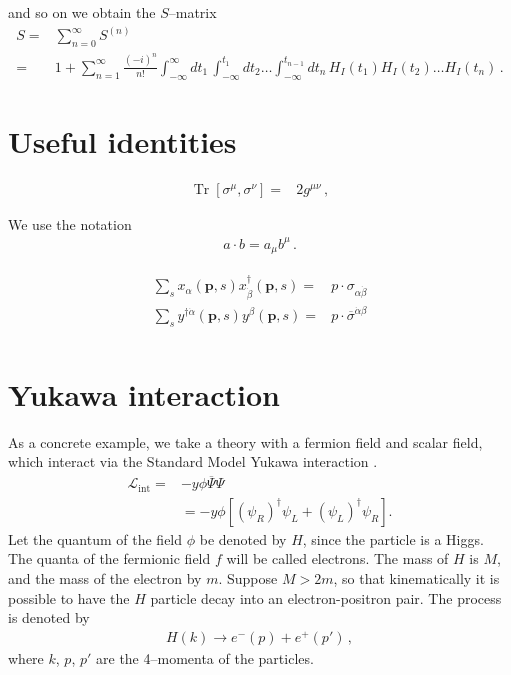 and so on we obtain the $S$--matrix
\begin{align}
  S=&\sum_{n=0}^\infty S^{(n)}\nonumber\\
  =&1+\sum_{n=1}^\infty\frac{(-i)^n}{n!}\int_{-\infty}^{\infty}d t_1\,\int_{-\infty}^{t_1} d t_2\ldots\int_{-\infty}^{t_{n-1}}d t_n\,{H}_I(t_1){H}_I(t_2)\ldots{H}_I(t_n)\,.
\end{align}

\section{Useful identities}
\begin{align} %
  \label{eq:trss}
  \operatorname{Tr}\left[ \sigma^{\mu},\sigma^{\nu} \right]=&2 g^{\mu\nu}\,,
\end{align}


We use the notation
\begin{align}
  a\cdot b=a_{\mu}b^{\mu}\,.
\end{align}

\begin{align}
\label{eq:xxd}
  \sum_s x_{\alpha}(\mathbf{p},s)x^{\dagger}_{\dot{\beta}}(\mathbf{p},s)=&p\cdot \sigma_{\alpha\dot{\beta}} \nonumber\\
   \sum_s y^{\dagger \dot{\alpha}}(\mathbf{p},s) y^{\beta}(\mathbf{p},s)=&p\cdot \overline{\sigma}^{\dot{\alpha}\beta} \nonumber\\
\end{align}



\section{Yukawa interaction}
\label{sec:feynman-diagrams}
As a concrete example, we take a theory with a fermion field and scalar field, which interact via the Standard Model Yukawa interaction \cite{Lahiri:2005sm}. 
\begin{align}
\label{eq:lppp}
  \mathcal{L}_{\text{int}}=&-y\phi\overline{\Psi}\Psi \nonumber\\
&=-y \phi \left[\left( \psi_R \right)^{\dagger}\psi_L+\left(\psi_L \right)^{\dagger}\psi_R  \right].
\end{align}
Let the quantum of the field $\phi$ be denoted by $H$, since the particle is a Higgs. The quanta of the fermionic field $f$ will be called electrons. The mass of $H$ is $M$, and the mass of the electron by $m$. Suppose $M\gt 2m$,  so that kinematically it is possible to have the $H$ particle decay into an electron-positron pair. The process is denoted by
\begin{align}
  H(k)\to e^-(p)+e^+(p')\,,
\end{align}
where $k$, $p$, $p'$ are the 4--momenta of the particles.

